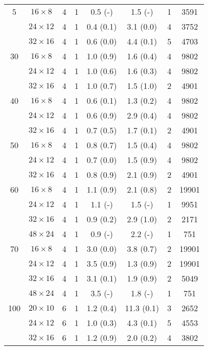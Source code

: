 \begin{longtable}{cccccccc}
\midrule
  5 & $16 \times   8$ &  4 & 1 & 0.5 \; (-) & 1.5 \; (-) & 1 & 3591 \\
    & $24 \times  12$ &  4 & 1 & 0.4 \; (0.1) & 3.1 \; (0.0) & 4 & 3752 \\
    & $32 \times  16$ &  4 & 1 & 0.6 \; (0.0) & 4.4 \; (0.1) & 5 & 4703 \\
\midrule
 30 & $16 \times   8$ &  4 & 1 & 1.0 \; (0.9) & 1.6 \; (0.4) & 4 & 9802 \\
    & $24 \times  12$ &  4 & 1 & 1.0 \; (0.6) & 1.6 \; (0.3) & 4 & 9802 \\
    & $32 \times  16$ &  4 & 1 & 1.0 \; (0.7) & 1.5 \; (1.0) & 2 & 4901 \\
\midrule
 40 & $16 \times   8$ &  4 & 1 & 0.6 \; (0.1) & 1.3 \; (0.2) & 4 & 9802 \\
    & $24 \times  12$ &  4 & 1 & 0.6 \; (0.9) & 2.9 \; (0.4) & 4 & 9802 \\
    & $32 \times  16$ &  4 & 1 & 0.7 \; (0.5) & 1.7 \; (0.1) & 2 & 4901 \\
\midrule
 50 & $16 \times   8$ &  4 & 1 & 0.8 \; (0.7) & 1.5 \; (0.4) & 4 & 9802 \\
    & $24 \times  12$ &  4 & 1 & 0.7 \; (0.0) & 1.5 \; (0.9) & 4 & 9802 \\
    & $32 \times  16$ &  4 & 1 & 0.8 \; (0.9) & 2.1 \; (0.9) & 2 & 4901 \\
\midrule
 60 & $16 \times   8$ &  4 & 1 & 1.1 \; (0.9) & 2.1 \; (0.8) & 2 & 19901 \\
    & $24 \times  12$ &  4 & 1 & 1.1 \; (-) & 1.5 \; (-) & 1 & 9951 \\
    & $32 \times  16$ &  4 & 1 & 0.9 \; (0.2) & 2.9 \; (1.0) & 2 & 2171 \\
    & $48 \times  24$ &  4 & 1 & 0.9 \; (-) & 2.2 \; (-) & 1 & 751 \\
\midrule
 70 & $16 \times   8$ &  4 & 1 & 3.0 \; (0.0) & 3.8 \; (0.7) & 2 & 19901 \\
    & $24 \times  12$ &  4 & 1 & 3.5 \; (0.9) & 1.3 \; (0.9) & 2 & 19901 \\
    & $32 \times  16$ &  4 & 1 & 3.1 \; (0.1) & 1.9 \; (0.9) & 2 & 5049 \\
    & $48 \times  24$ &  4 & 1 & 3.5 \; (-) & 1.8 \; (-) & 1 & 751 \\
\midrule
100 & $20 \times  10$ &  6 & 1 & 1.2 \; (0.4) & 11.3 \; (0.1) & 3 & 2652 \\
    & $24 \times  12$ &  6 & 1 & 1.0 \; (0.3) & 4.3 \; (0.1) & 5 & 4553 \\
    & $32 \times  16$ &  6 & 1 & 1.2 \; (0.9) & 2.0 \; (0.2) & 4 & 3802 \\

\end{longtable}
